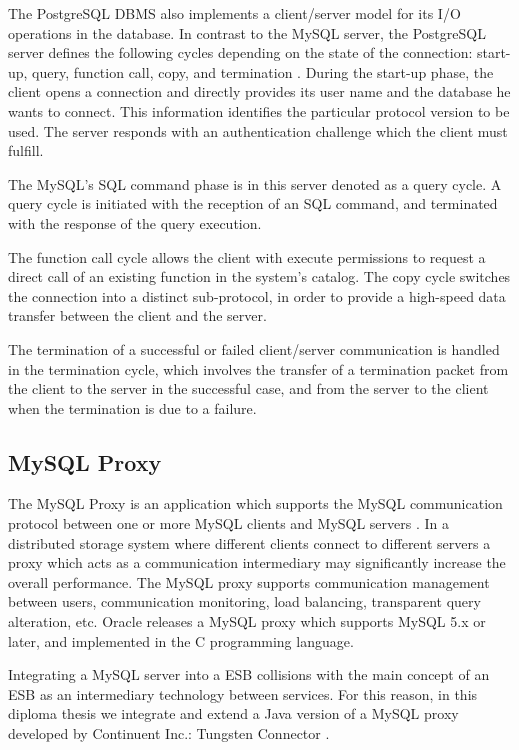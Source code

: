 The PostgreSQL \ac{DBMS} also implements a client/server model for its I/O operations in the database. In contrast to the MySQL server, the PostgreSQL server defines the following cycles depending on the state of the connection: start-up, query, function call, copy, and termination \cite{postgresqlmanual}. During the start-up phase, the client opens a connection and directly provides its user name and the database he wants to connect. This information identifies the particular protocol version to be used. The server responds with an authentication challenge which the client must fulfill. 

The MySQL's SQL command phase is in this server denoted as a query cycle. A query cycle is initiated with the reception of an SQL command, and terminated with the response of the query execution. 

The function call cycle allows the client with execute permissions to request a direct call of an existing function in the system's catalog. The copy cycle switches the connection into a distinct sub-protocol, in order to provide a high-speed data transfer between the client and the server. 

The termination of a successful or failed client/server communication is handled in the termination cycle, which involves the transfer of a termination packet from the client to the server in the successful case, and from the server to the client when the termination is due to a failure. 
 
\subsection{MySQL Proxy}

The MySQL Proxy is an application which supports the MySQL communication protocol between one or more MySQL clients and MySQL servers \cite{mysqlproxy}. In a distributed storage system where different clients connect to different servers a proxy which acts as a communication intermediary may significantly increase the overall performance. The MySQL proxy supports communication management between users, communication monitoring, load balancing, transparent query alteration, etc. Oracle releases a MySQL proxy which supports MySQL 5.x or later, and implemented in the C programming language. 

Integrating a MySQL server into a \ac{ESB} collisions with the main concept of an \ac{ESB} as an intermediary technology between services. For this reason, in this diploma thesis we integrate and extend a Java version of a MySQL proxy developed by Continuent Inc.: Tungsten Connector \cite{tungstenwiki}.

